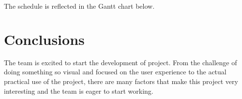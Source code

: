 \documentclass[twocolumn,twoside,11pt,a4paper]{article}
\begin{document}
The schedule is reflected in the Gantt chart below.


\section{Conclusions}\label{sec:conclusions}

The team is excited to start the development of project. From the challenge of doing something so visual and focused on the user experience to the actual practical use of the project, there are many factors that make this project very interesting and the team is eager to start working.



\renewcommand{\bibname}{Referências}
%
%

%


\end{document}
